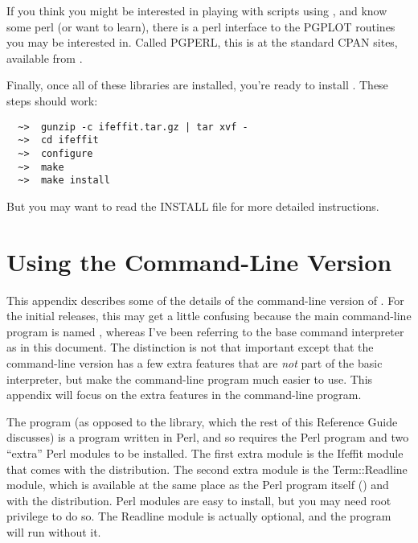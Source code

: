 If you think you might be interested in playing with scripts using
{\ifeffit}, and know some perl (or want to learn), there is a perl
interface to the PGPLOT routines you may be interested in. Called PGPERL,
this is at the standard CPAN sites, available from {\WWWperl}.

Finally, once all of these libraries are installed, you're ready to install
{\ifeffit}.  These steps should work:
\begin{verbatim}
  ~>  gunzip -c ifeffit.tar.gz | tar xvf -
  ~>  cd ifeffit
  ~>  configure
  ~>  make
  ~>  make install
\end{verbatim}

But you may want to read the INSTALL file for more detailed instructions.

\section{Using the Command-Line Version} \label{App:Readline}

This appendix describes some of the details of the command-line version of
{\ifeffit}.  For the initial releases, this may get a little confusing
because the main command-line program is named {\ifeffit}, whereas I've
been referring to the base command interpreter as {\ifeffit} in this
document.  The distinction is not that important except that the
command-line version has a few extra features that are {\emph{not}} part of
the basic interpreter, but make the command-line program much easier to
use.  This appendix will focus on the extra features in the command-line
program.

The {\ifeffit} program (as opposed to the {\ifeffit} library, which the
rest of this Reference Guide discusses) is a program written in Perl, and
so requires the Perl program and two ``extra'' Perl modules to be
installed.  The first extra module is the Ifeffit module that comes with
the {\ifeffit} distribution.  The second extra module is the Term::Readline
module, which is available at the same place as the Perl program itself
({\WWWperl}) and with the {\ifeffit} distribution.  Perl modules are easy
to install, but you may need root privilege to do so.  The Readline module
is actually optional, and the {\ifeffit} program will run without it.


